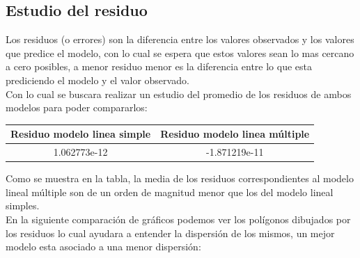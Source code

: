 \subsection{Estudio del residuo}

Los residuos (o errores) son la diferencia entre los valores observados y los valores que predice el modelo, con lo cual se espera que estos valores sean lo mas cercano a cero posibles, a menor residuo menor es la diferencia entre lo que esta prediciendo el modelo y el valor observado.\\
Con lo cual se buscara realizar un estudio del promedio de los residuos de ambos modelos para poder compararlos:\\



\begin{center}
 \begin{tabular}{||c c||} 
 \hline
    Residuo modelo linea simple & Residuo modelo linea múltiple \\ 
 \hline
 1.062773e-12 & -1.871219e-11 \\
 \hline
 \hline
\end{tabular}
\end{center}

Como se muestra en la tabla, la media de los residuos correspondientes al modelo lineal múltiple son de un orden de magnitud menor que los del modelo lineal simples.\\

En la siguiente comparación de gráficos podemos ver los polígonos dibujados por los residuos lo cual ayudara a entender la dispersión de los mismos, un mejor modelo esta asociado a una menor dispersión:


